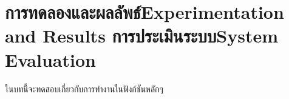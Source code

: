 \chapter{\ifproject%
\ifcpe การทดลองและผลลัพธ์\else Experimentation and Results\fi
\else%
\ifcpe การประเมินระบบ\else System Evaluation\fi
\fi}

ในบทนี้จะทดสอบเกี่ยวกับการทำงานในฟังก์ชันหลักๆ
